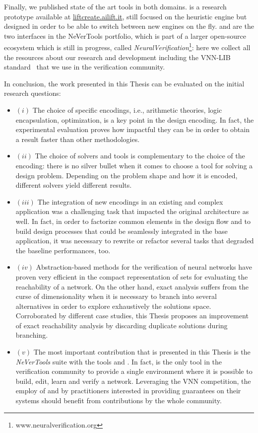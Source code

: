 Finally, we published state of the art tools in both domains. \liftcreate{} is a research
prototype available at \url{liftcreate.ailift.it}, still focused on the heuristic engine 
but designed in order to be able to switch between new engines on the fly.
\coconet{} and \nevertwo{} are the two interfaces in the NeVerTools portfolio, which is 
part of a larger open-source ecosystem which is still in progress, called
\textit{NeuralVerification}\footnote{www.neuralverification.org}: here we collect 
all the resources about our research and development including the VNN-LIB 
standard~\cite{vnnlib} that we use in the verification community.

In conclusion, the work presented in this Thesis can be evaluated on the initial research
questions:
\begin{itemize}
	\item $(i)$ The choice of specific encodings, i.e., arithmetic theories, logic
	encapsulation, optimization, is a key point in the design encoding. In fact, the
	experimental evaluation proves how impactful they can be in order to obtain a
	result faster than other methodologies.
	
	\item $(ii)$ The choice of solvers and tools is complementary to the choice of the
	encoding: there is no silver bullet when it comes to choose a tool for solving a 
	design problem. Depending on the problem shape and how it is encoded, different
	solvers yield different results.
	
	\item $(iii)$ The integration of new encodings in an existing and complex application
	was a challenging task that impacted the original architecture as well. In fact, in
	order to factorize common elements in the design flow and to build design processes
	that could be seamlessly integrated in the base application, it was necessary to rewrite
	or refactor several tasks that degraded the baseline performances, too.
	
	\item $(iv)$ Abstraction-based methods for the verification of neural networks have
	proven very efficient in the compact representation of sets for evaluating the 
	reachability of a network. On the other hand, exact analysis suffers from the curse
	of dimensionality when it is necessary to branch into several alternatives in order
	to explore exhaustively the solutions space. Corroborated by different case studies,
	this Thesis proposes an improvement of exact reachability analysis by discarding
	duplicate solutions during branching.
	
	\item $(v)$ The most important contribution that is presented in this Thesis is the
	\textit{NeVerTools} suite with the tools \coconet{} and \nevertwo. In fact, \nevertwo{}
	is the only tool in the verification community to provide a single environment where it
	is possible to build, edit, learn and verify a network. Leveraging the VNN competition,
	the employ of \coconet{} and \nevertwo{} by practitioners interested in providing
	guarantees on their systems should benefit from contributions by the whole community.
\end{itemize}